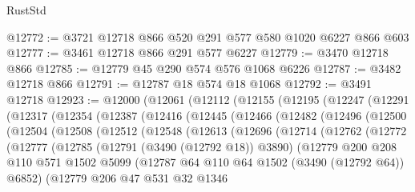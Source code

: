 \begin{lexlean}{RustStd}
\begin{coremodule}
{\begin{coremodule}
{{{{{{{{{{{{{{{{{{{{{{{{{{@12772 := @3721 @12718 @866 @520 @291 @577 @580 @1020 @6227 @866 @603
@12777 := @3461 @12718 @866 @291 @577 @6227
@12779 := @3470 @12718 @866
@12785 := @12779 @45 @290 @574 @576 @1068 @6226
@12787 := @3482 @12718 @866
@12791 := @12787 @18 @574 @18 @1068
@12792 := @3491 @12718
@12923 := @12000
    (@12061
      (@12112
        (@12155
          (@12195
            (@12247
              (@12291
                (@12317
                  (@12354
                    (@12387
                      (@12416
                        (@12445
                          (@12466
                            (@12482
                              (@12496
                                (@12500
                                  (@12504
                                    (@12508
                                      (@12512
                                        (@12548
                                          (@12613
                                            (@12696
                                              (@12714
                                                (@12762
                                                  (@12772
                                                    (@12777
                                                      (@12785
                                                        (@12791 (@3490 (@12792 @18)) @3890)
                                                        (@12779
                                                          @200
                                                          @208
                                                          @110
                                                          @571
                                                          @1502
                                                          @5099
                                                          (@12787
                                                            @64
                                                            @110
                                                            @64
                                                            @1502
                                                            (@3490 (@12792 @64))
                                                            @6852)
                                                          (@12779
                                                            @206
                                                            @47
                                                            @531
                                                            @32
                                                            @1346
}}}}}}}}}}}}}}}}}}}}}}}}}}
\end{coremodule}}
\end{coremodule}
\end{lexlean}
